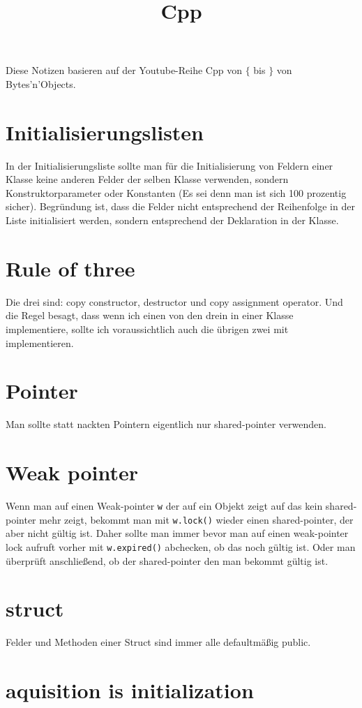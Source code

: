 \documentclass[paper=a4,10pt]{scrartcl}
\begin{document}
\title{Cpp}
Diese Notizen basieren auf der Youtube-Reihe Cpp von $\{$ bis $\}$ von Bytes'n'Objects. 


\section{Initialisierungslisten}
In der Initialisierungsliste sollte man für die Initialisierung von Feldern einer Klasse keine anderen Felder der selben Klasse verwenden, sondern Konstruktorparameter oder Konstanten (Es sei denn man ist sich 100 prozentig sicher). Begründung ist, dass die Felder nicht entsprechend der Reihenfolge in der Liste initialisiert werden, sondern entsprechend der Deklaration in der Klasse.

\section{Rule of three}
Die drei sind: copy constructor, destructor und copy assignment operator. Und die Regel besagt, dass wenn ich einen von den drein in einer Klasse implementiere, sollte ich voraussichtlich auch die übrigen zwei mit implementieren.

\section{Pointer}
Man sollte statt nackten Pointern eigentlich nur shared-pointer verwenden.

\section{Weak pointer}
Wenn man auf einen Weak-pointer \texttt{w} der auf ein Objekt zeigt auf das kein shared-pointer mehr zeigt, bekommt man mit \texttt{w.lock()} wieder einen shared-pointer, der aber nicht gültig ist. Daher sollte man immer bevor man auf einen weak-pointer lock aufruft vorher mit \texttt{w.expired()} abchecken, ob das noch gültig ist. Oder man überprüft anschließend, ob der shared-pointer den man bekommt gültig ist. 

\section{struct}
Felder und Methoden einer Struct sind immer alle defaultmäßig public.

\section{aquisition is initialization}
\end{document}
